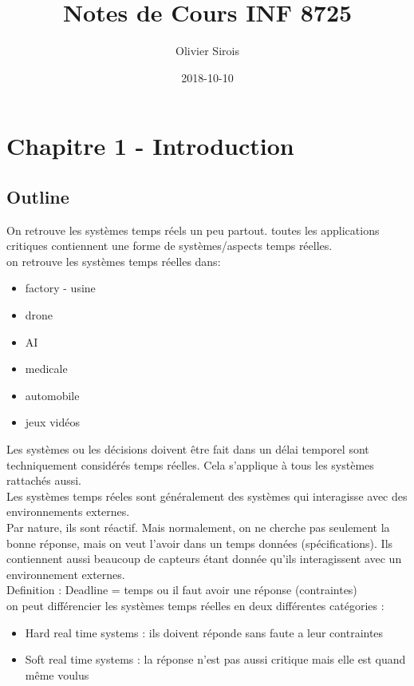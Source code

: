 \documentclass[oneside]{book}
\title{Notes de Cours INF 8725}
\date{2018-10-10}
\author{Olivier Sirois}
\begin{document}
    \setcounter{page}{1}
    \maketitle
    \tableofcontents
    \chapter{Chapitre 1 - Introduction}
    
    \section[Info]{Outline}
    On retrouve les systèmes temps réels un peu partout. toutes les applications critiques contiennent une forme de systèmes/aspects temps réelles.\\
    
    on retrouve les systèmes temps réelles dans:
    \begin{itemize}
        \item factory - usine
        \item drone
        \item AI
        \item medicale
        \item automobile
        \item jeux vidéos
    \end{itemize}

    Les systèmes ou les décisions doivent être fait dans un délai temporel sont techniquement considérés temps réelles. Cela s'applique à tous les systèmes rattachés aussi.\\
    
    Les systèmes temps réeles sont généralement des systèmes qui interagisse avec des environnements externes.\\
    
    Par nature, ils sont réactif. Mais normalement, on ne cherche pas seulement la bonne réponse, mais on veut l'avoir dans un temps données (spécifications). Ils contiennent aussi beaucoup de capteurs étant donnée qu'ils interagissent avec un environnement externes.\\
    
    Definition : Deadline  = temps ou il faut avoir une réponse (contraintes)\\
    
    on peut différencier les systèmes temps réelles en deux différentes catégories :
    \begin{itemize}
        \item Hard real time systems : ils doivent réponde sans faute a leur contraintes
        \item Soft real time systems : la réponse n'est pas aussi critique mais elle est quand même voulus
    \end{itemize}
       
\end{document}
